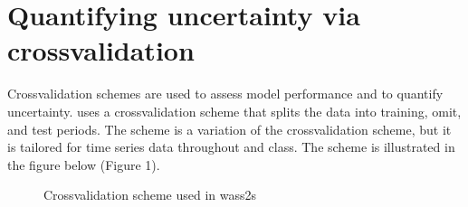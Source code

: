 \documentclass[letterpaper,10pt,english]{sphinxmanual}
\begin{document}
\begin{sphinxVerbatim}[commandchars=\\\{\}]
   

  
\end{sphinxVerbatim}

\sphinxstepscope


\section{Quantifying uncertainty via cross\sphinxhyphen{}validation}
\label{\detokenize{cv:quantifying-uncertainty-via-cross-validation}}\label{\detokenize{cv::doc}}
\sphinxAtStartPar
Cross\sphinxhyphen{}validation schemes are used to assess model performance and to quantify uncertainty.  uses a cross\sphinxhyphen{}validation scheme that splits the data into training, omit, and test periods. The scheme is a variation of the  cross\sphinxhyphen{}validation scheme, but it is tailored for time series data throughout  and  class. The scheme is illustrated in the figure below (Figure 1).

\begin{figure}[htbp]
\centering
\capstart

\noindent{}
\caption{Cross\sphinxhyphen{}validation scheme used in wass2s}\label{\detokenize{cv:id1}}\end{figure}
\end{document}
